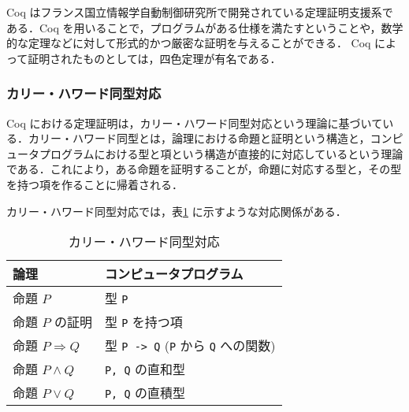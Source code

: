 Coq はフランス国立情報学自動制御研究所で開発されている定理証明支援系である\cite[Coq]{Coq}．Coq を用いることで，プログラムがある仕様を満たすということや，数学的な定理などに対して形式的かつ厳密な証明を与えることができる．
Coq によって証明されたものとしては，四色定理が有名である\cite[fourcolor]{fourcolor}．


\subsubsection{カリー・ハワード同型対応}

Coq における定理証明は，カリー・ハワード同型対応という理論に基づいている．カリー・ハワード同型とは，論理における命題と証明という構造と，コンピュータプログラムにおける型と項という構造が直接的に対応しているという理論である．これにより，ある命題を証明することが，命題に対応する型と，その型を持つ項を作ることに帰着される．

カリー・ハワード同型対応では，表\ref{tab:ch_iso} に示すような対応関係がある．

\begin{table}[!h]
  \caption{カリー・ハワード同型対応}
  \begin{center}
    \begin{tabular}{|ll|}
      \hline
      論理                   & コンピュータプログラム \\ \hline
      命題 $P$               & 型 {\tt P} \\
      命題 $P$ の証明        & 型 {\tt P} を持つ項 \\
      命題 $P \Rightarrow Q$ & 型 {\tt P -> Q} ({\tt P} から {\tt Q} への関数) \\
      命題 $P \wedge Q$      & {\tt P, Q} の直和型 \\
      命題 $P \vee Q$        & {\tt P, Q} の直積型 \\
      \hline
    \end{tabular}
    \label{tab:ch_iso}
  \end{center}
\end{table}



